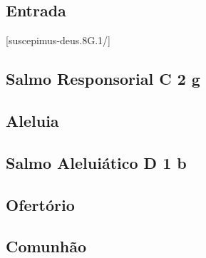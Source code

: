 
\subsection{Entrada}\label{subsection:tempus-per-annum/missa-4/psalmi-ad-introitum}
[suscepimus-deus.8G.1/]

\AllowPageFlush

\subsection[Salmo Responsorial]{Salmo Responsorial \textmd{C 2 g}}\label{subsection:tempus-per-annum/missa-4/psalmus-responsorius}

\subsection{Aleluia}\label{subsection:tempus-per-annum/missa-4/alleluia}

\AllowPageFlush

\subsection[Salmo Aleluiático]{Salmo Aleluiático \textmd{D 1 b}}\label{subsection:tempus-per-annum/missa-4/psalmus-alleluiaticus}

\AllowPageFlush

\subsection{Ofertório}\label{subsection:tempus-per-annum/missa-4/psalmi-ad-offertorium}

\AllowPageFlush

\subsection{Comunhão}\label{subsection:tempus-per-annum/missa-4/psalmi-ad-communionem}
